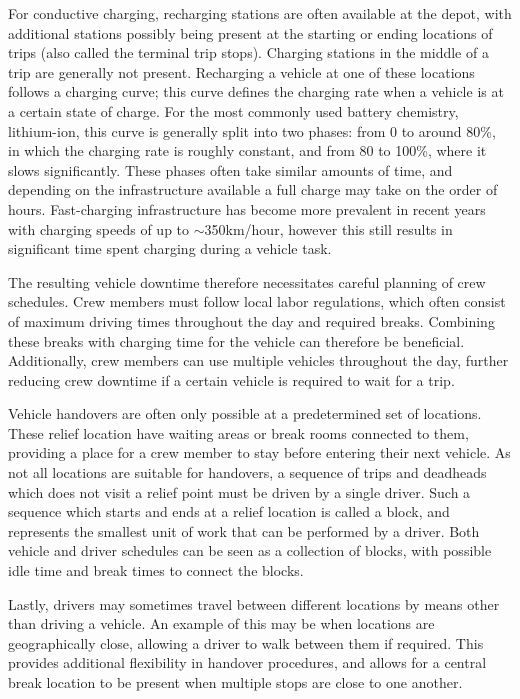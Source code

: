 \documentclass[]{article}
\begin{document}
For conductive charging, recharging stations are often available at the depot, with additional stations possibly being present at the starting or ending locations of trips (also called the terminal trip stops). Charging stations in the middle of a trip are generally not present. Recharging a vehicle at one of these locations follows a charging curve; this curve defines the charging rate when a vehicle is at a certain state of charge. For the most commonly used battery chemistry, lithium-ion, this curve is generally split into two phases: from 0 to around 80\%, in which the charging rate is roughly constant, and from 80 to 100\%, where it slows significantly. These phases often take similar amounts of time, and depending on the infrastructure available a full charge may take on the order of hours. Fast-charging infrastructure has become more prevalent in recent years with charging speeds of up to $\sim$350km/hour, however this still results in significant time spent charging during a vehicle task.

The resulting vehicle downtime therefore necessitates careful planning of crew schedules. Crew members must follow local labor regulations, which often consist of maximum driving times throughout the day and required breaks. Combining these breaks with charging time for the vehicle can therefore be beneficial. Additionally, crew members can use multiple vehicles throughout the day, further reducing crew downtime if a certain vehicle is required to wait for a trip.

Vehicle handovers are often only possible at a predetermined set of locations. These relief location have waiting areas or break rooms connected to them, providing a place for a crew member to stay before entering their next vehicle. As not all locations are suitable for handovers, a sequence of trips and deadheads which does not visit a relief point must be driven by a single driver. Such a sequence which starts and ends at a relief location is called a block, and represents the smallest unit of work that can be performed by a driver. Both vehicle and driver schedules can be seen as a collection of blocks, with possible idle time and break times to connect the blocks.

Lastly, drivers may sometimes travel between different locations by means other than driving a vehicle. An example of this may be when locations are geographically close, allowing a driver to walk between them if required. This provides additional flexibility in handover procedures, and allows for a central break location to be present when multiple stops are close to one another.
\end{document}
